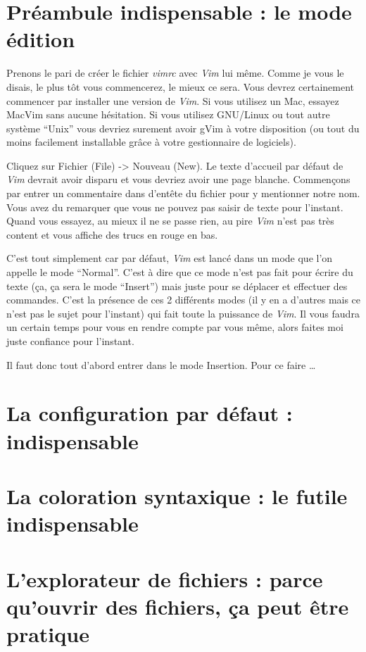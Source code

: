 \section{Préambule indispensable : le mode édition}

Prenons le pari de créer le fichier \emph{vimrc} avec \emph{Vim} lui même. Comme je vous le disais, le plus tôt vous commencerez, le mieux ce sera.
Vous devrez certainement commencer par installer une version de \emph{Vim}. Si vous utilisez un Mac, essayez MacVim  sans aucune hésitation. Si vous utilisez GNU/Linux ou tout autre système ``Unix'' vous devriez surement avoir gVim à votre disposition (ou tout du moins facilement installable grâce à votre gestionnaire de logiciels).

Cliquez sur Fichier (File) -> Nouveau (New). Le texte d'accueil par défaut de \emph{Vim} devrait avoir disparu et vous devriez avoir une page blanche. Commençons par entrer un commentaire dans d'entête du fichier pour y mentionner notre nom. Vous avez du remarquer que vous ne pouvez pas saisir de texte pour l'instant. Quand vous essayez, au mieux il ne se passe rien, au pire \emph{Vim} n'est pas très content et vous affiche des trucs en rouge en bas.

C'est tout simplement car par défaut, \emph{Vim} est lancé dans un mode que l'on appelle le mode ``Normal''. C'est à dire que ce mode n'est pas fait pour écrire du texte (ça, ça sera le mode ``Insert'') mais juste pour se déplacer et effectuer des commandes. C'est la présence de ces 2 différents modes (il y en a d'autres mais ce n'est pas le sujet pour l'instant) qui fait toute la puissance de \emph{Vim}. Il vous faudra un certain temps pour vous en rendre compte par vous même, alors faites moi juste confiance pour l'instant.

Il faut donc tout d'abord entrer dans le mode Insertion. Pour ce faire \ldots

\section{La configuration par défaut : indispensable}



\section{La coloration syntaxique : le futile indispensable}

\TODO

\section{L'explorateur de fichiers : parce qu'ouvrir des fichiers, ça peut être pratique}

\TODO

\printindex


